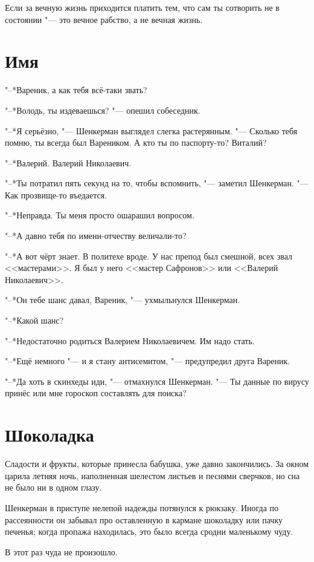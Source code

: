 Если за вечную жизнь приходится платить тем, что сам ты сотворить не в состоянии "--- это вечное рабство, а не вечная жизнь.

\section{Имя}

"--*Вареник, а как тебя всё-таки звать?

"--*Володь, ты издеваешься? "--- опешил собеседник.

"--*Я серьёзно, "--- Шенкерман выглядел слегка растерянным.
"--- Сколько тебя помню, ты всегда был Вареником.
А кто ты по паспорту-то?
Виталий?

"--*Валерий.
Валерий Николаевич.

"--*Ты потратил пять секунд на то, чтобы вспомнить, "--- заметил Шенкерман. 
"--- Как прозвище-то въедается.

"--*Неправда.
Ты меня просто ошарашил вопросом.

"--*А давно тебя по имени-отчеству величали-то?

"--*А вот чёрт знает.
В политехе вроде.
У нас препод был смешной, всех звал <<мастерами>>.
Я был у него <<мастер Сафронов>> или <<Валерий Николаевич>>.

"--*Он тебе шанс давал, Вареник, "--- ухмыльнулся Шенкерман.

"--*Какой шанс?

"--*Недостаточно родиться Валерием Николаевичем.
Им надо стать.

"--*Ещё немного "--- и я стану антисемитом, "--- предупредил друга Вареник.

"--*Да хоть в скинхеды иди, "--- отмахнулся Шенкерман.
"--- Ты данные по вирусу принёс или мне гороскоп составлять для поиска?

\section{Шоколадка}

Сладости и фрукты, которые принесла бабушка, уже давно закончились.
За окном царила летняя ночь, наполненная шелестом листьев и песнями сверчков, но сна не было ни в одном глазу.

Шенкерман в приступе нелепой надежды потянулся к рюкзаку.
Иногда по рассеянности он забывал про оставленную в кармане шоколадку или пачку печенья;
когда пропажа находилась, это было всегда сродни маленькому чуду.

В этот раз чуда не произошло.

